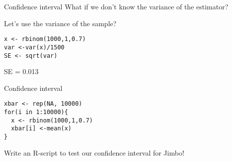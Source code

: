 \documentclass[presentation]{beamer}
\begin{document}
\begin{frame}[fragile,label={sec:orga651d90}]{Confidence interval}
 What if we don't know the variance of the estimator?

Let's use the variance of the sample?

\begin{verbatim}
x <- rbinom(1000,1,0.7)
var <-var(x)/1500
SE <- sqrt(var)
\end{verbatim}

SE = 0.013
\end{frame}


\begin{frame}[fragile,label={sec:orga2016c8}]{Confidence interval}
 \begin{verbatim}
xbar <- rep(NA, 10000)
for(i in 1:10000){
  x <- rbinom(1000,1,0.7)
  xbar[i] <-mean(x)
}
\end{verbatim}

Write an R-script to test our confidence interval for Jimbo!
\end{frame}
\end{document}
